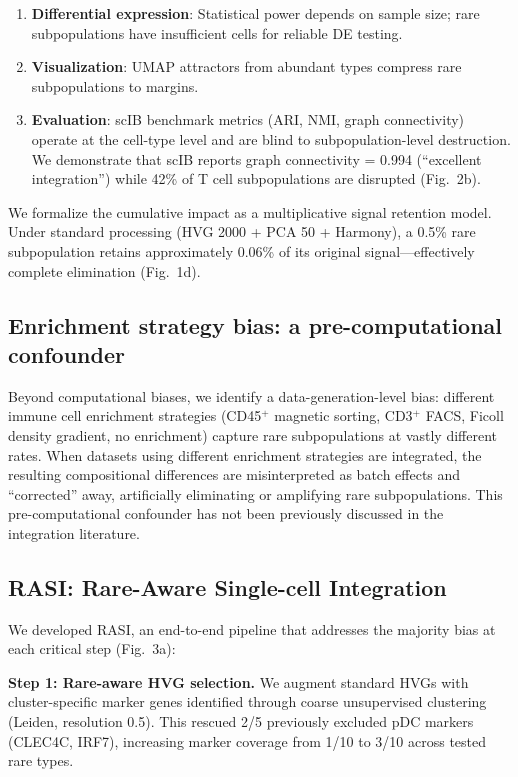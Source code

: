 \documentclass[10pt]{article}
\begin{document}
\begin{enumerate}
\item \textbf{Differential expression}: Statistical power depends on sample size; rare subpopulations have insufficient cells for reliable DE testing.

\item \textbf{Visualization}: UMAP attractors from abundant types compress rare subpopulations to margins.

\item \textbf{Evaluation}: scIB benchmark metrics (ARI, NMI, graph connectivity) operate at the cell-type level and are blind to subpopulation-level destruction. We demonstrate that scIB reports graph connectivity = 0.994 (``excellent integration'') while 42\% of T cell subpopulations are disrupted (Fig.~2b).
\end{enumerate}

We formalize the cumulative impact as a multiplicative signal retention model. Under standard processing (HVG 2000 + PCA 50 + Harmony), a 0.5\% rare subpopulation retains approximately 0.06\% of its original signal---effectively complete elimination (Fig.~1d).

\subsection{Enrichment strategy bias: a pre-computational confounder}

Beyond computational biases, we identify a data-generation-level bias: different immune cell enrichment strategies (CD45$^+$ magnetic sorting, CD3$^+$ FACS, Ficoll density gradient, no enrichment) capture rare subpopulations at vastly different rates. When datasets using different enrichment strategies are integrated, the resulting compositional differences are misinterpreted as batch effects and ``corrected'' away, artificially eliminating or amplifying rare subpopulations. This pre-computational confounder has not been previously discussed in the integration literature.

\subsection{RASI: Rare-Aware Single-cell Integration}

We developed RASI, an end-to-end pipeline that addresses the majority bias at each critical step (Fig.~3a):

\textbf{Step 1: Rare-aware HVG selection.} We augment standard HVGs with cluster-specific marker genes identified through coarse unsupervised clustering (Leiden, resolution 0.5). This rescued 2/5 previously excluded pDC markers (CLEC4C, IRF7), increasing marker coverage from 1/10 to 3/10 across tested rare types.
\end{document}

